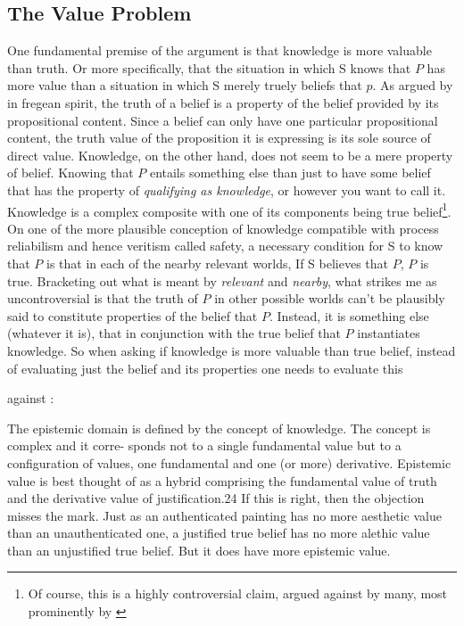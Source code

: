 \documentclass[12pt,numbers=noenddot]{scrartcl}
\begin{document}
\subsection{The Value Problem}

One fundamental premise of the argument is that knowledge is more valuable than truth. Or more specifically, that the situation in which S knows that $P$ has more value than a situation in which S merely truely beliefs that $p$. As argued by \textcite[35-38]{grundmann2008} in fregean spirit, the truth of a belief is a property of the belief provided by its propositional content. Since a belief can only have one particular propositional content, the truth value of the proposition it is expressing is its sole source of direct value. Knowledge, on the other hand, does not seem to be a mere property of belief. Knowing that $P$ entails something else than just to have some belief that has the property of \emph{qualifying as knowledge}, or however you want to call it. Knowledge is a complex composite with one of its components being true belief\footnote{Of course, this is a highly controversial claim, argued against by many, most prominently by \textcite{Williamson2000-WILKAI}}. On one of the more plausible conception of knowledge compatible with process reliabilism and hence veritism called safety, a necessary condition for S to know that $P$ is that in each of the nearby relevant worlds, If S believes that $P$, $P$ is true. Bracketing out what is meant by \emph{relevant} and \emph{nearby}, what strikes me as uncontroversial is that the truth of $P$ in other possible worlds can't be plausibly said to constitute properties of the belief that $P$. Instead, it is something else (whatever it is), that in conjunction with the true belief that $P$ instantiates knowledge. So when asking if knowledge is more valuable than true belief, instead of evaluating just the belief and its properties one needs to evaluate this

against \textcite[291]{Stapleford2016}:

The epistemic domain is defined by the concept of knowledge. The concept is complex and it corre- sponds not to a single fundamental value but to a configuration of values, one fundamental and one (or more) derivative. Epistemic value is best thought of as a hybrid comprising the fundamental value of truth and the derivative value of justification.24 If this is right, then the objection misses the mark. Just as an authenticated painting has no more aesthetic value than an unauthenticated one, a justified true belief has no more alethic value than an unjustified true belief. But it does have more epistemic value.
\end{document}
